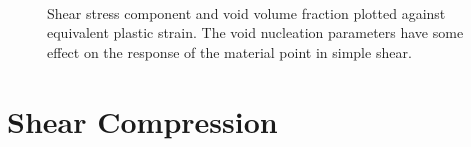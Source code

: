 \begin{figure}[htbp]
  \begin{center}
    ~ 
    \caption{Shear stress component and void volume fraction plotted
      against equivalent plastic strain. The void nucleation
      parameters have some effect on the response of the
      material point in simple shear.}
    \label{fig:shear-nuc}
  \end{center}
\end{figure}

\section{Shear Compression}
\label{shear-comp}

